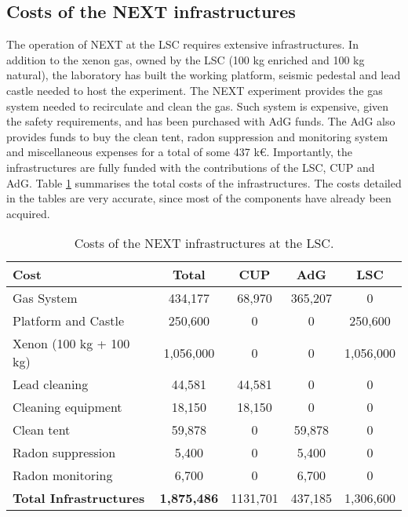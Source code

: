 \subsection{Costs of the NEXT infrastructures}
The operation of NEXT at the LSC requires extensive infrastructures. In addition to the xenon gas, owned by the LSC (100 kg enriched and 100 kg natural), the laboratory has built the working platform, seismic pedestal and lead castle needed to host the experiment. The NEXT experiment provides the gas system needed to recirculate and clean the gas. Such system is expensive, given the safety requirements, and has been purchased with AdG funds. The AdG also provides funds to buy the clean tent, radon suppression and monitoring system and miscellaneous expenses for a total of some
437 k\euro. Importantly, the infrastructures are fully funded with the contributions of the LSC, CUP and AdG. 
Table \ref{tab.n100:INFRA} summarises the total costs of the infrastructures. The costs detailed in the tables are very accurate, since most of the components have already been acquired. 


  
\begin{table}[h!]
\begin{center}
\begin{tabular}{|l|c|c|c|c|}
\hline
 Cost &	Total& 	CUP & AdG &  LSC \\
 \hline
Gas System &	434,177 &	 68,970 &	365,207 &	0 \\
Platform and Castle	& 250,600 & 	0	&0 &	250,600 \\
Xenon (100 kg + 100 kg)	& 1,056,000	& 0 &	0 & 1,056,000 \\
Lead cleaning	& 44,581 &44,581 &	0 & 0 \\
Cleaning equipment	& 18,150	& 18,150	& 0	& 0	\\
Clean tent	 & 59,878	&	0& 59,878 &	0	\\
Radon suppression 	& 5,400 &	0 &	5,400 &	0	\\
Radon monitoring &	6,700 &	0	& 6,700	& 0	\\
 \hline
{\bf Total Infrastructures} &	{\bf1,875,486}& 1131,701 & 437,185 & 1,306,600 \\	
 \hline\hline
\end{tabular}  
\caption{Costs of the NEXT infrastructures at the LSC.}
\label{tab.n100:INFRA}
\end{center}
\end{table} 

